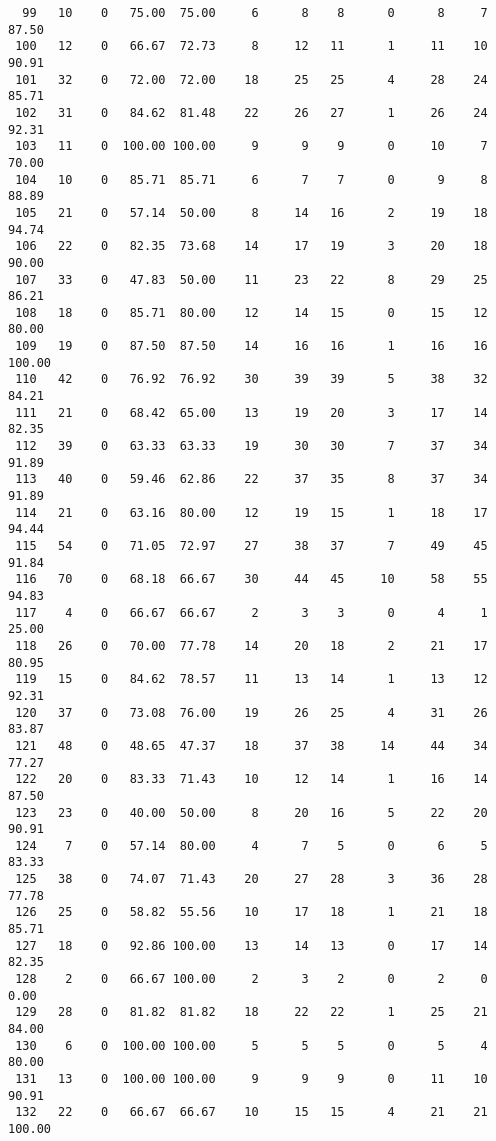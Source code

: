 \begin{verbatim}
  99   10    0   75.00  75.00     6      8    8      0      8     7    87.50
 100   12    0   66.67  72.73     8     12   11      1     11    10    90.91
 101   32    0   72.00  72.00    18     25   25      4     28    24    85.71
 102   31    0   84.62  81.48    22     26   27      1     26    24    92.31
 103   11    0  100.00 100.00     9      9    9      0     10     7    70.00
 104   10    0   85.71  85.71     6      7    7      0      9     8    88.89
 105   21    0   57.14  50.00     8     14   16      2     19    18    94.74
 106   22    0   82.35  73.68    14     17   19      3     20    18    90.00
 107   33    0   47.83  50.00    11     23   22      8     29    25    86.21
 108   18    0   85.71  80.00    12     14   15      0     15    12    80.00
 109   19    0   87.50  87.50    14     16   16      1     16    16   100.00
 110   42    0   76.92  76.92    30     39   39      5     38    32    84.21
 111   21    0   68.42  65.00    13     19   20      3     17    14    82.35
 112   39    0   63.33  63.33    19     30   30      7     37    34    91.89
 113   40    0   59.46  62.86    22     37   35      8     37    34    91.89
 114   21    0   63.16  80.00    12     19   15      1     18    17    94.44
 115   54    0   71.05  72.97    27     38   37      7     49    45    91.84
 116   70    0   68.18  66.67    30     44   45     10     58    55    94.83
 117    4    0   66.67  66.67     2      3    3      0      4     1    25.00
 118   26    0   70.00  77.78    14     20   18      2     21    17    80.95
 119   15    0   84.62  78.57    11     13   14      1     13    12    92.31
 120   37    0   73.08  76.00    19     26   25      4     31    26    83.87
 121   48    0   48.65  47.37    18     37   38     14     44    34    77.27
 122   20    0   83.33  71.43    10     12   14      1     16    14    87.50
 123   23    0   40.00  50.00     8     20   16      5     22    20    90.91
 124    7    0   57.14  80.00     4      7    5      0      6     5    83.33
 125   38    0   74.07  71.43    20     27   28      3     36    28    77.78
 126   25    0   58.82  55.56    10     17   18      1     21    18    85.71
 127   18    0   92.86 100.00    13     14   13      0     17    14    82.35
 128    2    0   66.67 100.00     2      3    2      0      2     0     0.00
 129   28    0   81.82  81.82    18     22   22      1     25    21    84.00
 130    6    0  100.00 100.00     5      5    5      0      5     4    80.00
 131   13    0  100.00 100.00     9      9    9      0     11    10    90.91
 132   22    0   66.67  66.67    10     15   15      4     21    21   100.00

\end{verbatim}
